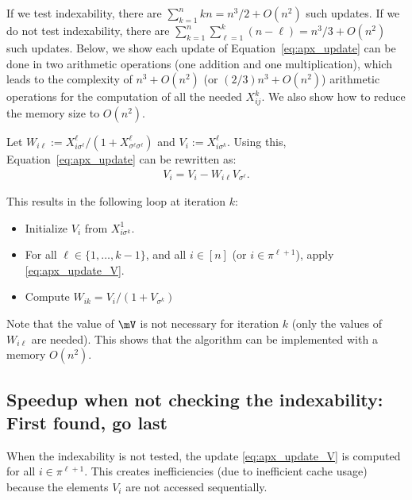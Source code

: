 \begin{subappendices}
If we test indexability, there are $\sum_{k=1}^nk n = n^3/2+O(n^2)$ such updates. If we do not test indexability, there are $\sum_{k=1}^n \sum_{\ell=1}^k (n-\ell) = n^3/3 + O(n^2)$ such updates.  Below, we show each update of Equation~\eqref{eq:apx_update} can be done in two arithmetic operations (one addition and one multiplication), which leads to the complexity of $n^3+O(n^2)$ (or $(2/3)n^3+O(n^2)$) arithmetic operations for the computation of all the needed $X^k_{ij}$.  We also show how to reduce the memory size to $O(n^2)$.

Let $W_{i\ell} := X^\ell_{i \sigma^\ell}/(1+X^\ell_{\sigma^\ell\sigma^\ell})$ and $V_i :=X^\ell_{i\sigma^k}$. Using this, Equation~\eqref{eq:apx_update} can be rewritten as: 
\begin{align}
    \label{eq:apx_update_V}
    V_{i} = V_{i} - W_{i\ell} V_{\sigma^{\ell}}.
\end{align}

This results in the following loop at iteration $k$:
\begin{itemize}
    \item Initialize $V_{i}$ from $X^1_{i\sigma^k}$. 
    \item For all $\ell\in\{1,\dots, k-1\}$, and all $i\in[n]$ (or $i\in\pi^{\ell+1}$), apply \eqref{eq:apx_update_V}. 
    \item Compute $W_{ik}= V_{i}/(1+V_{\sigma^k})$
\end{itemize}
Note that the value of $\mV$ is not necessary for iteration $k$ (only the values of $W_{i\ell}$ are needed). This shows that the algorithm can be implemented with a memory $O(n^2)$.%

\subsection{Speedup when not checking the indexability: First found, go last}
When the indexability is not tested, the update \eqref{eq:apx_update_V} is computed for all $i\in\pi^{\ell+1}$. This creates inefficiencies (due to  inefficient cache usage) because the elements $V_{i}$ are not accessed sequentially.


\end{subappendices}
